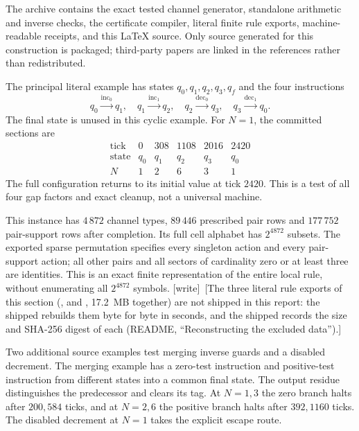 \documentclass[11pt,letterpaper]{article}
\numberwithin{equation}{section}
\theoremstyle{definition}
\theoremstyle{remark}
\newcommand{\wtag}{\textup{[write]}}
\begin{document}
The archive contains the exact tested channel generator, standalone arithmetic and inverse checks, the certificate compiler, literal finite rule exports, machine-readable receipts, and this LaTeX source. Only source generated for this construction is packaged; third-party papers are linked in the references rather than redistributed.

The principal literal example has states $q_0,q_1,q_2,q_3,q_f$ and the four instructions
\[
q_0\xrightarrow{\operatorname{inc}_0}q_1,
\quad q_1\xrightarrow{\operatorname{inc}_1}q_2,
\quad q_2\xrightarrow{\operatorname{dec}_0}q_3,
\quad q_3\xrightarrow{\operatorname{dec}_1}q_0.
\]
The final state is unused in this cyclic example. For $N=1$, the committed sections are
\[
\begin{array}{c|rrrrr}
\text{tick}&0&308&1108&2016&2420\\\hline
\text{state}&q_0&q_1&q_2&q_3&q_0\\
N&1&2&6&3&1
\end{array}
\]
The full configuration returns to its initial value at tick $2420$. This is a test of all four gap factors and exact cleanup, not a universal machine.

This instance has $4\,872$ channel types, $89\,446$ prescribed pair rows and $177\,752$ pair-support rows after completion. Its full cell alphabet has $2^{4872}$ subsets. The exported sparse permutation specifies every singleton action and every pair-support action; all other pairs and all sectors of cardinality zero or at least three are identities. This is an exact finite representation of the entire local rule, without enumerating all $2^{4872}$ symbols.
\wtag\ [The three literal rule exports of this section (,  and , 17.2~MB together) are not shipped in this report: the shipped  rebuilds them byte for byte in seconds, and the shipped  records the size and SHA-256 digest of each (README, ``Reconstructing the excluded data'').]

Two additional source examples test merging inverse guards and a disabled decrement. The merging example has a zero-test instruction and positive-test instruction from different states into a common final state. The output residue distinguishes the predecessor and clears its tag. At $N=1,3$ the zero branch halts after $200,584$ ticks, and at $N=2,6$ the positive branch halts after $392,1160$ ticks. The disabled decrement at $N=1$ takes the explicit escape route.
\end{document}
